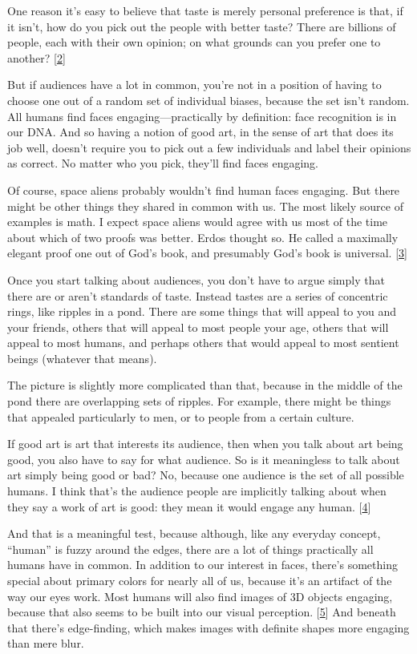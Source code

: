 One reason it's easy to believe that taste is merely personal preference
is that, if it isn't, how do you pick out the people with better taste?
There are billions of people, each with their own opinion; on what
grounds can you prefer one to another? {[}\hyperref[f2n]{2}{]}

But if audiences have a lot in common, you're not in a position of
having to choose one out of a random set of individual biases, because
the set isn't random. All humans find faces engaging---practically by
definition: face recognition is in our DNA. And so having a notion of
good art, in the sense of art that does its job well, doesn't require
you to pick out a few individuals and label their opinions as correct.
No matter who you pick, they'll find faces engaging.

Of course, space aliens probably wouldn't find human faces engaging. But
there might be other things they shared in common with us. The most
likely source of examples is math. I expect space aliens would agree
with us most of the time about which of two proofs was better. Erdos
thought so. He called a maximally elegant proof one out of God's book,
and presumably God's book is universal. {[}\hyperref[f3n]{3}{]}

Once you start talking about audiences, you don't have to argue simply
that there are or aren't standards of taste. Instead tastes are a series
of concentric rings, like ripples in a pond. There are some things that
will appeal to you and your friends, others that will appeal to most
people your age, others that will appeal to most humans, and perhaps
others that would appeal to most sentient beings (whatever that means).

The picture is slightly more complicated than that, because in the
middle of the pond there are overlapping sets of ripples. For example,
there might be things that appealed particularly to men, or to people
from a certain culture.

If good art is art that interests its audience, then when you talk about
art being good, you also have to say for what audience. So is it
meaningless to talk about art simply being good or bad? No, because one
audience is the set of all possible humans. I think that's the audience
people are implicitly talking about when they say a work of art is good:
they mean it would engage any human. {[}\hyperref[f4n]{4}{]}

And that is a meaningful test, because although, like any everyday
concept, ``human'' is fuzzy around the edges, there are a lot of things
practically all humans have in common. In addition to our interest in
faces, there's something special about primary colors for nearly all of
us, because it's an artifact of the way our eyes work. Most humans will
also find images of 3D objects engaging, because that also seems to be
built into our visual perception. {[}\hyperref[f5n]{5}{]} And beneath
that there's edge-finding, which makes images with definite shapes more
engaging than mere blur.


